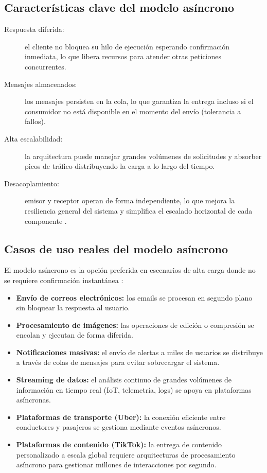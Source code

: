 \documentclass[12pt,a4paper]{article}
\begin{document}
\subsection{Características clave del modelo asíncrono}
 
\begin{description}
  \item[Respuesta diferida:] el cliente no bloquea su hilo de ejecución esperando confirmación inmediata, lo que libera recursos para atender otras peticiones concurrentes.
  \item[Mensajes almacenados:] los mensajes persisten en la cola, lo que garantiza la entrega incluso si el consumidor no está disponible en el momento del envío (tolerancia a fallos).
  \item[Alta escalabilidad:] la arquitectura puede manejar grandes volúmenes de solicitudes y absorber picos de tráfico distribuyendo la carga a lo largo del tiempo.
  \item[Desacoplamiento:] emisor y receptor operan de forma independiente, lo que mejora la resiliencia general del sistema y simplifica el escalado horizontal de cada componente \cite{ref12}.
\end{description}
 
\subsection{Casos de uso reales del modelo asíncrono}
 
El modelo asíncrono es la opción preferida en escenarios de alta carga donde no se requiere confirmación instantánea \cite{ref13}:
 
\begin{itemize}
  \item \textbf{Envío de correos electrónicos:} los emails se procesan en segundo plano sin bloquear la respuesta al usuario.
  \item \textbf{Procesamiento de imágenes:} las operaciones de edición o compresión se encolan y ejecutan de forma diferida.
  \item \textbf{Notificaciones masivas:} el envío de alertas a miles de usuarios se distribuye a través de colas de mensajes para evitar sobrecargar el sistema.
  \item \textbf{Streaming de datos:} el análisis continuo de grandes volúmenes de información en tiempo real (IoT, telemetría, logs) se apoya en plataformas asíncronas.
  \item \textbf{Plataformas de transporte (Uber):} la conexión eficiente entre conductores y pasajeros se gestiona mediante eventos asíncronos.
  \item \textbf{Plataformas de contenido (TikTok):} la entrega de contenido personalizado a escala global requiere arquitecturas de procesamiento asíncrono para gestionar millones de interacciones por segundo.
\end{itemize}
 
\end{document}
